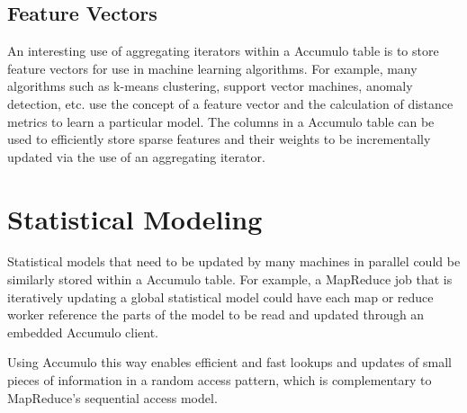 \subsection{Feature Vectors}

An interesting use of aggregating iterators within a Accumulo table is to store
feature vectors for use in machine learning algorithms. For example, many
algorithms such as k-means clustering, support vector machines, anomaly detection,
etc. use the concept of a feature vector and the calculation of distance metrics to
learn a particular model. The columns in a Accumulo table can be used to efficiently
store sparse features and their weights to be incrementally updated via the use of an
aggregating iterator.

\section{Statistical Modeling}

Statistical models that need to be updated by many machines in parallel could be
similarly stored within a Accumulo table. For example, a MapReduce job that is
iteratively updating a global statistical model could have each map or reduce worker
reference the parts of the model to be read and updated through an embedded
Accumulo client.

Using Accumulo this way enables efficient and fast lookups and updates of small
pieces of information in a random access pattern, which is complementary to
MapReduce's sequential access model.

